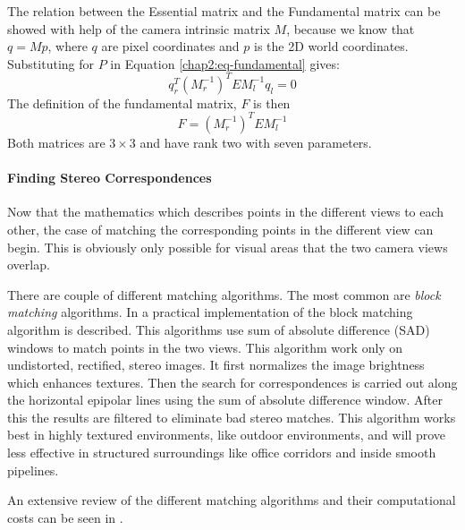The relation between the Essential matrix and the Fundamental matrix can be showed with
help of the camera intrinsic matrix $M$, because we know that $q = Mp$, where $q$ are
pixel coordinates and $p$ is the 2D world coordinates. Substituting for $P$ in Equation
\eqref{chap2:eq-fundamental} gives: \cite{openCV}
\begin{equation}
    q_r^T(M_r^{-1})^T E M_l^{-1} q_l = 0
\end{equation}
The definition of the fundamental matrix, $F$ is then
\begin{equation}
    F = (M_r^{-1})^T E M_l^{-1}
\end{equation}
Both matrices are $3\times3$ and have rank two with seven parameters.


\paragraph{Finding Stereo Correspondences}
Now that the mathematics which describes points in the different views to each other, the
case of matching the corresponding points in the different view can begin. 
This is obviously only possible for visual areas that the two camera views overlap. 

There are couple of different matching algorithms. The most common are \emph{block
matching} algorithms. In \cite{konolige} a practical implementation of the block
matching algorithm is described. This algorithms use sum of absolute difference (SAD) windows to match 
points in the two views. This algorithm work only on undistorted, rectified, stereo
images. It first normalizes the image brightness which enhances textures. Then the search
for correspondences is carried out along the horizontal epipolar lines using the sum of
absolute difference window. After this the results are filtered to eliminate bad stereo
matches. This algorithm works best in highly textured environments, like outdoor
environments, and will prove less effective in structured surroundings like office
corridors and inside smooth pipelines. 

An extensive review of the different matching algorithms and their computational costs
can be seen in \cite{stereo-algorithms}.


